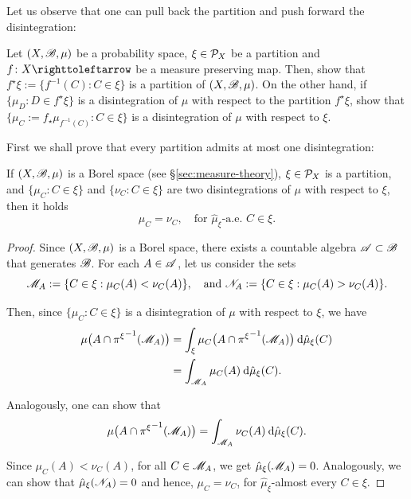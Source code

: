 Let us observe that one can pull back the partition and push forward the disintegration:

\begin{exercise}\label{exer:push-forward-disint-pull-back-partitions}
  Let $(X,\mathscr{B},\mu)$ be a probability space, $\xi\in\mathcal{P}_{X}$ be a partition and $f\colon X\carr$ be a measure preserving map. Then, show that $f^{\star}\xi:=\{f^{-1}(C) : C\in\xi\}$ is a partition of $(X,\mathscr{B},\mu)$. On the other hand, if $\{\mu_{D} : D\in f^{\star}\xi\}$ is a disintegration of $\mu$ with respect to the partition $f^{\star}\xi$, show that $\{\mu_{C}:=f_{\star}\mu_{f^{-1}(C)} :  C\in\xi\}$ is a disintegration of $\mu$ with respect to $\xi$.
\end{exercise}



First we shall prove that every partition admits at most one disintegration:

\begin{theorem}\label{thm:unique-disintegration}
  If $(X,\mathscr{B},\mu)$ is a Borel space (see \S\ref{sec:measure-theory}), $\xi\in\mathcal{P}_{X}$ is a partition, and $\{\mu_{C} : C\in\xi\}$ and $\{\nu_{C} : C\in\xi\}$ are two disintegrations of $\mu$ with respect to $\xi$, then it holds
  \begin{displaymath}
    \mu_{C}=\nu_{C}, \quad\text{for } \hat\mu_{\xi}\text{-a.e. } C\in\xi.
  \end{displaymath}
\end{theorem}

\begin{proof}
  Since $(X,\mathscr{B},\mu)$ is a Borel space, there exists a countable algebra $\mathscr{A}\subset\mathscr{B}$ that generates $\mathscr{B}$.
  For each $A\in\mathscr{A}$, let us consider the sets
  \begin{displaymath}
    \mathscr{M}_{A}:=\{C\in\xi : \mu_{C}(A)<\nu_{C}(A)\},\quad\text{and } \mathscr{N}_{A}:=\{C\in\xi : \mu_{C}(A)>\nu_{C}(A)\}.
  \end{displaymath}

  Then, since $\{\mu_{C} : C\in\xi\}$ is a disintegration of $\mu$ with respect to $\xi$, we have
  \begin{displaymath}
    \begin{split}
      \mu\big(A\cap{\pi^{\xi}}^{-1}(\mathscr{M}_{A})\big) &= \int_{\xi} \mu_{C}\big(A\cap{\pi^{\xi}}^{-1}(\mathscr{M}_{A})\big)\:\mathrm{d}\hat\mu_{\xi}(C)\\
      &=\int_{\mathscr{M}_{A}} \mu_{C}(A)\:\mathrm{d}\hat\mu_{\xi}(C).
    \end{split}
  \end{displaymath}

  Analogously, one can show that
  \begin{displaymath}
    \mu\big(A\cap{\pi^{\xi}}^{-1}(\mathscr{M}_{A})\big)=\int_{\mathscr{M}_{A}} \nu_{C}(A)\:\mathrm{d}\hat\mu_{\xi}(C).
  \end{displaymath}

  Since $\mu_{C}(A)<\nu_{C}(A)$, for all $C\in\mathscr{M}_{A}$, we get $\hat\mu_{\xi}(\mathscr{M}_{A})=0$. Analogously, we can show that $\hat\mu_{\xi}(\mathscr{N}_{A})=0$ and hence, $\mu_{C}=\nu_{C}$, for $\hat\mu_{\xi}$-almost every $C\in\xi$.
\end{proof}

